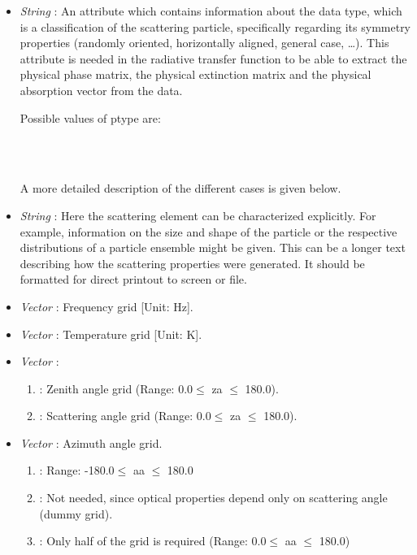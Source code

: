 \begin{itemize}
\item  {\sl String} : An attribute which contains
  information about the 
  data type, which is a classification of the scattering
  particle, specifically regarding its symmetry properties (randomly oriented,
  horizontally aligned, general case, \dots). This attribute is
  needed in the radiative transfer function to be able to extract
  the physical phase matrix, the physical extinction matrix and the
  physical absorption vector from the data. 
  
  Possible values of ptype are:
  
   \\
   \\
  
  A more detailed description of the different cases is given below.

\item {\sl String} : Here the scattering element
  can be characterized explicitly. For example, information on the size and
  shape of the particle or the respective distributions of a particle ensemble
  might be given. This can be a longer text describing how the scattering
  properties were generated. It should be formatted for direct printout to screen
  or file.
  
\item {\sl Vector} : Frequency grid [Unit: Hz].
  
\item {\sl Vector} : Temperature grid [Unit: K].
  
\item {\sl Vector} :
  \begin{enumerate}
  \item {}: Zenith angle grid (Range: 0.0\degree $\le$ za $\le$ 180.0\degree).
  \item {}: Scattering angle grid (Range: 0.0\degree $\le$ za $\le$ 180.0\degree).
  \end{enumerate}
  
\item {\sl Vector} : Azimuth angle grid.
  \begin{enumerate}
  \item {}: Range: -180.0\degree $\le$ aa $\le$ 180.0\degree
  \item {}: Not needed, since optical properties depend only on
    scattering angle (dummy grid).
  \item {}: Only half of the grid is required (Range: 0.0\degree $\le$ aa $\le$ 180.0\degree)
  \end{enumerate}
  

\end{itemize}
